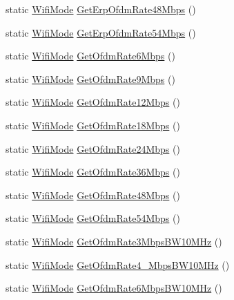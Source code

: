 \begin{DoxyCompactItemize}
\item 
static \hyperlink{classns3_1_1WifiMode}{Wifi\+Mode} \hyperlink{classns3_1_1WifiPhy_a3c00f00fdfce4e6146264549f2274499}{Get\+Erp\+Ofdm\+Rate48\+Mbps} ()
\item 
static \hyperlink{classns3_1_1WifiMode}{Wifi\+Mode} \hyperlink{classns3_1_1WifiPhy_a444ffd175dd58e76f87ba8dc05eef483}{Get\+Erp\+Ofdm\+Rate54\+Mbps} ()
\item 
static \hyperlink{classns3_1_1WifiMode}{Wifi\+Mode} \hyperlink{classns3_1_1WifiPhy_a9945d5d1e8dd74118f90e1adcb63d6fe}{Get\+Ofdm\+Rate6\+Mbps} ()
\item 
static \hyperlink{classns3_1_1WifiMode}{Wifi\+Mode} \hyperlink{classns3_1_1WifiPhy_a4fd9fa3cc3080908d55d9713266f2943}{Get\+Ofdm\+Rate9\+Mbps} ()
\item 
static \hyperlink{classns3_1_1WifiMode}{Wifi\+Mode} \hyperlink{classns3_1_1WifiPhy_a2435bc31eebe859883b7ac21c9add9d2}{Get\+Ofdm\+Rate12\+Mbps} ()
\item 
static \hyperlink{classns3_1_1WifiMode}{Wifi\+Mode} \hyperlink{classns3_1_1WifiPhy_ab456e46ced9b58473153802857be1bde}{Get\+Ofdm\+Rate18\+Mbps} ()
\item 
static \hyperlink{classns3_1_1WifiMode}{Wifi\+Mode} \hyperlink{classns3_1_1WifiPhy_a088ad8dd890aa893acea0d44df88e2aa}{Get\+Ofdm\+Rate24\+Mbps} ()
\item 
static \hyperlink{classns3_1_1WifiMode}{Wifi\+Mode} \hyperlink{classns3_1_1WifiPhy_a64c9c3a3e3a41d2aa51f7d0ccb8fe6c1}{Get\+Ofdm\+Rate36\+Mbps} ()
\item 
static \hyperlink{classns3_1_1WifiMode}{Wifi\+Mode} \hyperlink{classns3_1_1WifiPhy_aa48b1e5f7ebde9ced3dc0f25d9505ae0}{Get\+Ofdm\+Rate48\+Mbps} ()
\item 
static \hyperlink{classns3_1_1WifiMode}{Wifi\+Mode} \hyperlink{classns3_1_1WifiPhy_a767b1cebf94aea21b9c476563c6e3f5b}{Get\+Ofdm\+Rate54\+Mbps} ()
\item 
static \hyperlink{classns3_1_1WifiMode}{Wifi\+Mode} \hyperlink{classns3_1_1WifiPhy_a8c565c787448b738ea94b455169371fa}{Get\+Ofdm\+Rate3\+Mbps\+B\+W10\+M\+Hz} ()
\item 
static \hyperlink{classns3_1_1WifiMode}{Wifi\+Mode} \hyperlink{classns3_1_1WifiPhy_a96acd60bbfdc2ffe88dcc6cf201e73ee}{Get\+Ofdm\+Rate4\+\_\+Mbps\+B\+W10\+M\+Hz} ()
\item 
static \hyperlink{classns3_1_1WifiMode}{Wifi\+Mode} \hyperlink{classns3_1_1WifiPhy_aa7c91565a17bc8f93f766dea8351d9f7}{Get\+Ofdm\+Rate6\+Mbps\+B\+W10\+M\+Hz} ()
\item 

\end{DoxyCompactItemize}
